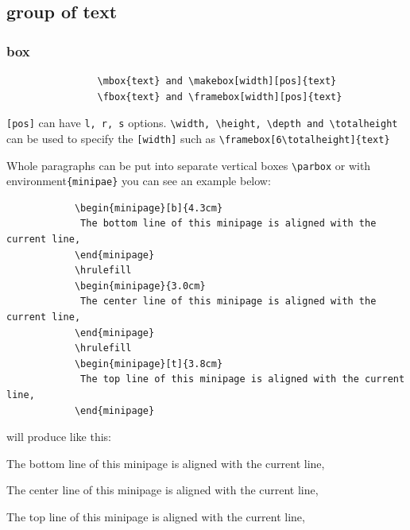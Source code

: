 \documentclass[a4paper,12pt,twoside]{book}
\begin{document}
			
	\subsection{group of text}
		\subsubsection{box}
			\begin{verbatim}
				\mbox{text} and \makebox[width][pos]{text}
				\fbox{text} and \framebox[width][pos]{text}
			\end{verbatim}	
			\verb=[pos]= can have \verb=l, r, s= options. \verb=\width, \height, \depth and \totalheight= can be used to specify the \verb=[width]= such as \verb=\framebox[6\totalheight]{text}= \par

			Whole paragraphs can be put into separate vertical boxes \verb=\parbox= or with environment\verb={minipae}= you can see an example below:\par
			
			\begin{verbatim}
			\begin{minipage}[b]{4.3cm}
			 The bottom line of this minipage is aligned with the current line,
			\end{minipage}
			\hrulefill
			\begin{minipage}{3.0cm}
			 The center line of this minipage is aligned with the current line,
			\end{minipage}
			\hrulefill
			\begin{minipage}[t]{3.8cm}
			 The top line of this minipage is aligned with the current line,
			\end{minipage}
			\end{verbatim}
			will produce like this: \par

			\begin{minipage}[b]{4.3cm}
			 The bottom line of this minipage is aligned with the current line,
			\end{minipage}
			\hrulefill
			\begin{minipage}{3.0cm}
			 The center line of this minipage is aligned with the current line,
			\end{minipage}
			\hrulefill
			\begin{minipage}[t]{3.8cm}
			 The top line of this minipage is aligned with the current line,
			\end{minipage}
\end{document}
